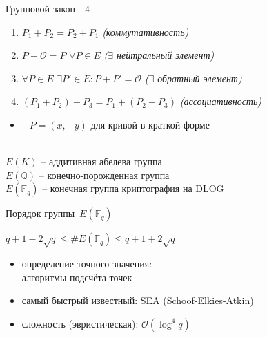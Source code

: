 \documentclass{beamer}
\begin{document}
	\begin{frame}{Групповой закон - 4}%
		\begin{tcolorbox}[colframe=title-and-section-color!120, colback=title-and-section-color!5, title=Теорема, center title]
			\begin{enumerate}
				\item $P_1 + P_2 = P_2 + P_1$ \hfill \textit{(коммутативность)}
				
				\item $P + \mathcal{O} = P$ $\forall P \in E$ \hfill \textit{($\exists$ нейтральный элемент)}
				
				\item $\forall P \in E$ $\exists P' \in E: P + P' = \mathcal{O}$ \hfill \textit{($\exists$ обратный элемент)}
				
				\item $\left( P_1 + P_2 \right) + P_3 = P_1 + \left( P_2 + P_3 \right)$ \hfill \textit{(ассоциативность)}
			\end{enumerate}
		\end{tcolorbox}
		
		\begin{itemize}
			\item $-P = (x,-y)$ для кривой в краткой форме
		\end{itemize}
		
		 \\$
		E(K)$ -- аддитивная абелева группа
		\\
		$E(\mathbb{Q})$ -- конечно-порожденная группа
		\\
		$E(\mathbb{F}_q)$ -- конечная группа \structure{$\Rightarrow$} криптография на DLOG
	\end{frame}
	
	\begin{frame}{Порядок группы~$E(\mathbb{F}_q)$}
		\begin{center}
			\begin{tcolorbox}[enhanced,hbox,colback=box-blue-color!15,colframe=box-blue-color,title=Теорема Хассе,center title]
				\begin{varwidth}{\textwidth}
					$q + 1 - 2 \sqrt{q} \leq \#E(\mathbb{F}_q) \leq q + 1 + 2 \sqrt{q}$
				\end{varwidth}
			\end{tcolorbox}	
		\end{center}
		\begin{itemize}
			\item определение точного значения:\\алгоритмы подсчёта точек
			\item самый быстрый известный: SEA (Schoof-Elkies-Atkin)
			\item сложность (эвристическая): $\mathcal{O}(\log^4{q})$ 
		\end{itemize}
	\end{frame}
	
\end{document}
